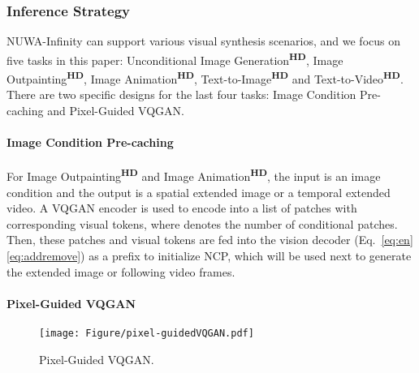 \documentclass{article}
\begin{document}
\subsubsection{Inference Strategy}\label{sec:is}
\vspace{-3mm}
NUWA-Infinity can support various visual synthesis scenarios, and we focus on five tasks in this paper: Unconditional Image Generation\textsuperscript{\textbf{HD}}, Image Outpainting\textsuperscript{\textbf{HD}}, Image Animation\textsuperscript{\textbf{HD}}, Text-to-Image\textsuperscript{\textbf{HD}} and Text-to-Video\textsuperscript{\textbf{HD}}. There are two specific designs for the last four tasks: Image Condition Pre-caching and Pixel-Guided VQGAN.


\paragraph{Image Condition Pre-caching}
\vspace{-3mm}
For Image Outpainting\textsuperscript{\textbf{HD}} and Image Animation\textsuperscript{\textbf{HD}}, the input is an image condition 
and the output is a spatial extended image or a temporal extended video. 
A VQGAN encoder is used to encode  into a list of patches with corresponding visual tokens, where  denotes the number of conditional patches. Then, these patches and visual tokens are fed into the vision decoder (Eq.~\ref{eq:en}\ref{eq:addremove}) as a prefix to initialize NCP, which will be used next to generate the extended image or following video frames.


\paragraph{Pixel-Guided VQGAN}
\vspace{-3mm}
\begin{wrapfigure}{r}{0.4\textwidth}
\vspace{-7mm}\texttt{[image: Figure/pixel-guidedVQGAN.pdf]}
    \caption{Pixel-Guided VQGAN.}
    \label{fig:pgvqgan}
\end{wrapfigure}
\end{document}
